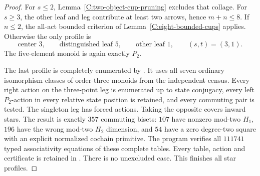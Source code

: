\begin{proof}
For $s\leq2$, Lemma~\ref{C:two-object-cup-pruning} excludes that
collage.  For $s\geq3$, the other leaf and leg contribute at least
two arrows, hence $m+n\leq8$.  If $n\leq2$, the all-act bounded
criterion of Lemma~\ref{C:eight-bounded-cups} applies.  Otherwise
the only profile is
\[
 \text{center }3,\qquad \text{distinguished leaf }5,
 \qquad \text{other leaf }1,
 \qquad (s,t)=(3,1).
\]
The five-element monoid is again exactly $P_2$.

The last profile is completely enumerated by
.  It uses all seven ordinary
isomorphism classes of order-three monoids from the independent
census.  Every right action on the three-point leg is enumerated
up to state conjugacy, every left $P_2$-action in every relative
state position is retained, and every commuting pair is tested.
The singleton leg has forced actions.  Taking the opposite covers
inward stars.  The result is exactly $357$ commuting bisets:
$107$ have nonzero mod-two $H_1$, $196$ have the wrong mod-two
$H_2$ dimension, and $54$ have a zero degree-two square with an
explicit normalized cochain primitive.  The program verifies all
$111741$ typed associativity equations of these complete tables.
Every table, action and certificate is retained in
.
There is no unexcluded case.  This finishes all star profiles.
\end{proof}
